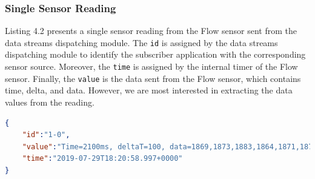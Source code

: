 \subsubsection{Single Sensor Reading}

Listing 4.2 presents a single sensor reading from the Flow sensor sent from the data streams dispatching module. The \verb|id| is assigned by the data streams dispatching module to identify the subscriber application with the corresponding sensor source. Moreover, the \verb|time| is assigned by the internal timer of the Flow sensor. Finally, the \verb|value| is the data sent from the Flow sensor, which contains time, delta, and data. However, we are most interested in extracting the data values from the reading. 

\begin{lstlisting}[language=json, caption={Contains a single sample received from the Flow sensor.}, captionpos=b]
{
    "id":"1-0",
    "value":"Time=2100ms, deltaT=100, data=1869,1873,1883,1864,1871,1870,1870",
    "time":"2019-07-29T18:20:58.997+0000"
}
\end{lstlisting}


